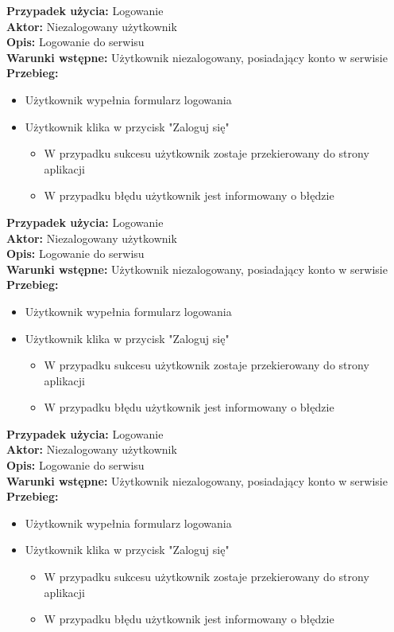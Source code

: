 \textbf{Przypadek użycia:} Logowanie\\
\textbf{Aktor:} Niezalogowany użytkownik\\
\textbf{Opis:} Logowanie do serwisu\\
\textbf{Warunki wstępne:} Użytkownik niezalogowany, posiadający konto w serwisie\\
\textbf{Przebieg:}
\begin{itemize}
    \item Użytkownik wypełnia formularz logowania
    \item Użytkownik klika w przycisk "Zaloguj się"
    \begin{itemize}
        \item W przypadku sukcesu użytkownik zostaje przekierowany do strony aplikacji
        \item W przypadku błędu użytkownik jest informowany o błędzie
    \end{itemize}
\end{itemize}

\textbf{Przypadek użycia:} Logowanie\\
\textbf{Aktor:} Niezalogowany użytkownik\\
\textbf{Opis:} Logowanie do serwisu\\
\textbf{Warunki wstępne:} Użytkownik niezalogowany, posiadający konto w serwisie\\
\textbf{Przebieg:}
\begin{itemize}
    \item Użytkownik wypełnia formularz logowania
    \item Użytkownik klika w przycisk "Zaloguj się"
    \begin{itemize}
        \item W przypadku sukcesu użytkownik zostaje przekierowany do strony aplikacji
        \item W przypadku błędu użytkownik jest informowany o błędzie
    \end{itemize}
\end{itemize}

\textbf{Przypadek użycia:} Logowanie\\
\textbf{Aktor:} Niezalogowany użytkownik\\
\textbf{Opis:} Logowanie do serwisu\\
\textbf{Warunki wstępne:} Użytkownik niezalogowany, posiadający konto w serwisie\\
\textbf{Przebieg:}
\begin{itemize}
    \item Użytkownik wypełnia formularz logowania
    \item Użytkownik klika w przycisk "Zaloguj się"
    \begin{itemize}
        \item W przypadku sukcesu użytkownik zostaje przekierowany do strony aplikacji
        \item W przypadku błędu użytkownik jest informowany o błędzie
    \end{itemize}
\end{itemize}

